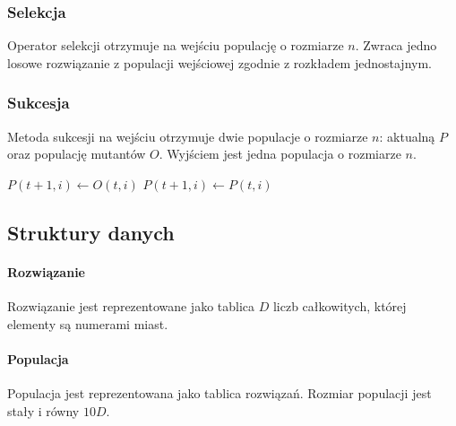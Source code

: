 \documentclass[12pt, a4paper]{article}
\begin{document}
\subsubsection{Selekcja}

Operator selekcji otrzymuje na wejściu populację o rozmiarze $n$. Zwraca jedno losowe rozwiązanie z populacji wejściowej
zgodnie z rozkładem jednostajnym.

\subsubsection{Sukcesja}

Metoda sukcesji na wejściu otrzymuje dwie populacje o rozmiarze $n$: aktualną $P$ oraz populację mutantów $O$.
Wyjściem jest jedna populacja o rozmiarze $n$.

\begin{algorithm}[!htb]
\begin{algorithmic}[1]
      \State $P(t+1, i) \gets O(t, i)$
    \Else
      \State $P(t+1, i) \gets P(t, i)$
    \EndIf
  \EndFor
\EndFunction
\end{algorithmic}
\end{algorithm}

\subsection{Struktury danych}
	\paragraph{Rozwiązanie}
		Rozwiązanie jest reprezentowane jako tablica $D$ liczb całkowitych, której elementy są numerami miast.
	\paragraph{Populacja}
		Populacja jest reprezentowana jako tablica rozwiązań. Rozmiar populacji jest stały i równy $10D$.
\end{document}
